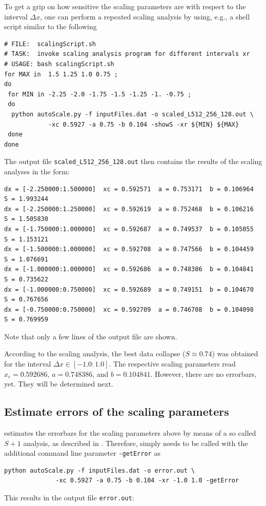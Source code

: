 To get a grip on how sensitive the scaling parameters are with respect to the interval
$\Delta x$, one can perform a repeated scaling analysis by using, e.g., a shell script
similar to the following

\begin{lstlisting}
# FILE:  scalingScript.sh
# TASK:  invoke scaling analysis program for different intervals xr
# USAGE: bash scalingScript.sh
for MAX in  1.5 1.25 1.0 0.75 ; 
do
 for MIN in -2.25 -2.0 -1.75 -1.5 -1.25 -1. -0.75 ;
 do
  python autoScale.py -f inputFiles.dat -o scaled_L512_256_128.out \
  	        -xc 0.5927 -a 0.75 -b 0.104 -showS -xr ${MIN} ${MAX}
 done
done
\end{lstlisting}
The output file \verb'scaled_L512_256_128.out' then contains the results of the
scaling analyses in the form:

\begin{lstlisting}
dx = [-2.250000:1.500000]  xc = 0.592571  a = 0.753171  b = 0.106964  S = 1.993244
dx = [-2.250000:1.250000]  xc = 0.592619  a = 0.752468  b = 0.106216  S = 1.505830
dx = [-1.750000:1.000000]  xc = 0.592687  a = 0.749537  b = 0.105055  S = 1.153121
dx = [-1.500000:1.000000]  xc = 0.592708  a = 0.747566  b = 0.104459  S = 1.076691
dx = [-1.000000:1.000000]  xc = 0.592686  a = 0.748386  b = 0.104841  S = 0.735622
dx = [-1.000000:0.750000]  xc = 0.592689  a = 0.749151  b = 0.104670  S = 0.767656
dx = [-0.750000:0.750000]  xc = 0.592709  a = 0.746708  b = 0.104098  S = 0.769959
\end{lstlisting}
Note that only a few lines of the output file are shown.

According to the scaling analysis, the best data collapse ($S\approx0.74$) was obtained for the
interval $\Delta x \in [-1.0:1.0]$. The respective scaling parameters read
$x_c=0.592686$,  $a=0.748386$, and  $b=0.104841$. However, there are no errorbars, yet.
They will be determined next.

\subsection{Estimate errors of the scaling parameters}
\label{ASAsect03subsect02}
\myProg{} estimates the errorbars for the scaling parameters above by means of a so called
$S+1$ analysis, as described in \cite{ASAhoudayer2004}.
Therefore, \myProg{} simply needs to be called with the additional command line parameter
\verb'-getError' as

\begin{lstlisting}
python autoScale.py -f inputFiles.dat -o error.out \
              -xc 0.5927 -a 0.75 -b 0.104 -xr -1.0 1.0 -getError
\end{lstlisting}
This results in the output file \verb'error.out':

